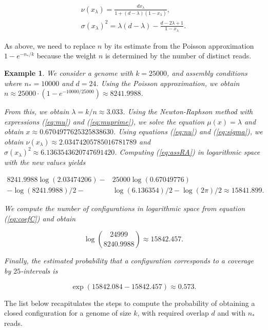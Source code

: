 \documentclass{article}
\newtheorem{example}{Example}
\begin{document}
\begin{gather}
\label{eq:nu} %
\nu(x_\lambda) = \frac{dx_\lambda}{1+(d-\lambda)(1-x_\lambda)}, \\
\label{eq:sigma} %
\sigma(x_\lambda)^2 = \lambda(d-\lambda) -
  \frac{d-2\lambda+1}{1-x_\lambda}.
\end{gather}

As above, we need to replace $n$ by its estimate from the Poisson
approximation $1-e^{-n_*/k}$ because the weight $n$ is determined by the
number of distinct reads.


\begin{example}
We consider a genome with $k = 25000$, and assembly conditions where $n_*
= 10000$ and $d=24$. Using the Poisson approximation, we obtain
$n \approx 25000 \cdot (1-e^{-10000/25000}) \approx 8241.9988$.

From this, we obtain $\lambda = k/n \approx 3.033$. Using the
Newton-Raphson method with expressions (\ref{eq:mu}) and
(\ref{eq:muprime}), we solve the equation $\mu(x) = \lambda$ and obtain
$x \approx 0.6704977625325838630$. Using equations (\ref{eq:nu}) and
(\ref{eq:sigma}), we obtain $\nu(x_\lambda) \approx
2.03474205785016781789$ and $\sigma(x_\lambda)^2 \approx
6.1363543620747691420$. Computing (\ref{eq:assRA}) in logarithmic space
with the new values yields

\begin{equation*}
\begin{split}
8241.9988\log(2.03474206) - &25000\log(0.67049776) \\
- \log(8241.9988)/2 - &\log(6.136354)/2 - \log(2\pi)/2
\approx 15841.899.
\end{split}
\end{equation*}

We compute the number of configurations in logarithmic space from equation
(\ref{eq:coefC}) and obtain

\begin{equation*}
\log { 24999 \choose 8240.9988 } \approx 15842.457.
\end{equation*}

Finally, the estimated probability that a configuration corresponds to a
coverage by $25$-intervals is

\begin{equation*}
\exp(15842.084-15842.457) \approx 0.573.
\end{equation*}
\end{example}

The list below recapitulates the steps to compute the probability of
obtaining a closed configuration for a genome of size $k$, with required
overlap $d$ and with $n_*$ reads.
\end{document}
